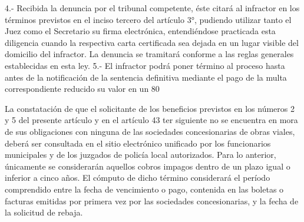     4.- Recibida la denuncia por el tribunal competente, éste citará al infractor en los términos previstos en el inciso tercero del artículo 3°, pudiendo utilizar tanto el Juez como el Secretario su firma electrónica, entendiéndose practicada esta diligencia cuando la respectiva carta certificada sea dejada en un lugar visible del domicilio del infractor. La denuncia se tramitará conforme a las reglas generales establecidas en esta ley.
    5.- El infractor podrá poner término al proceso hasta antes de la notificación de la sentencia definitiva mediante el pago de la multa correspondiente reducido su valor en un 80%

    La constatación de que el solicitante de los beneficios previstos en los números 2 y 5 del presente artículo y en el artículo 43 ter siguiente no se encuentra en mora de sus obligaciones con ninguna de las sociedades concesionarias de obras viales, deberá ser consultada en el sitio electrónico unificado por los funcionarios municipales y de los juzgados de policía local autorizados. Para lo anterior, únicamente se considerarán aquellos cobros impagos dentro de un plazo igual o inferior a cinco años. El cómputo de dicho término considerará el período comprendido entre la fecha de vencimiento o pago, contenida en las boletas o facturas emitidas por primera vez por las sociedades concesionarias, y la fecha de la solicitud de rebaja.

